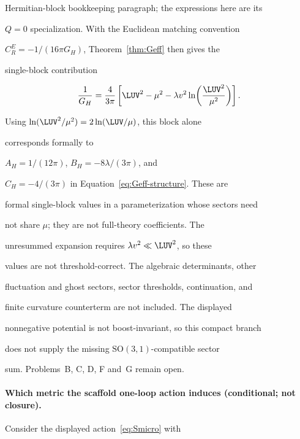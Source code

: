 Hermitian-block bookkeeping paragraph; the expressions here are its

\(Q=0\) specialization. With the Euclidean matching convention

\(C_R^E=-1/(16\pi G_H)\), Theorem~\ref{thm:Geff} then gives the

single-block contribution

\[

  \frac1{G_H}

  =\frac{4}{3\pi}\left[

     \LUV^2-\mu^2

     -\lambda v^2\ln\!\left(\frac{\LUV^2}{\mu^2}\right)

   \right].

\]

Using \(\ln(\LUV^2/\mu^2)=2\ln(\LUV/\mu)\), this block alone

corresponds formally to

\(A_H=1/(12\pi)\), \(B_H=-8\lambda/(3\pi)\), and

\(C_H=-4/(3\pi)\) in Equation~\eqref{eq:Geff-structure}. These are

formal single-block values in a parameterization whose sectors need

not share \(\mu\); they are not full-theory coefficients. The

unresummed expansion requires \(\lambda v^2\ll\LUV^2\), so these

values are not threshold-correct. The algebraic determinants, other

fluctuation and ghost sectors, sector thresholds, continuation, and

finite curvature counterterm are not included. The displayed

nonnegative potential is not boost-invariant, so this compact branch

does not supply the missing \(\mathrm{SO}(3,1)\)-compatible sector

sum. Problems~B, C, D, F and~G remain open.





\paragraph{Which metric the scaffold one-loop action induces (conditional; not closure).} \label{detail:sec-F-paragraphwhichmetricthescaffol-26}

Consider the displayed action~\eqref{eq:Smicro} with


